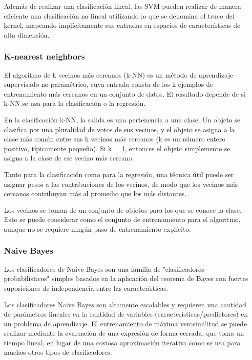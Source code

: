 Además de realizar una clasificación lineal, las SVM pueden realizar de manera eficiente una clasificación no lineal utilizando lo que se denomina el truco del kernel, mapeando implícitamente sus entradas en espacios de características de alta dimensión.\par


\subsubsection{ K-nearest neighbors} \par
El algoritmo de k vecinos más cercanos (k-NN) es un método de aprendizaje supervisado no paramétrico, cuya entrada consta de los k ejemplos de entrenamiento más cercanos en un conjunto de datos. El resultado depende de si k-NN se usa para la clasificación o la regresión.\par
En la clasificación k-NN, la salida es una pertenencia a una clase. Un objeto se clasifica por una pluralidad de votos de sus vecinos, y el objeto se asigna a la clase más común entre sus k vecinos más cercanos (k es un número entero positivo, típicamente pequeño). Si k = 1, entonces el objeto simplemente se asigna a la clase de ese vecino más cercano.\par

Tanto para la clasificación como para la regresión, una técnica útil puede ser asignar pesos a las contribuciones de los vecinos, de modo que los vecinos más cercanos contribuyan más al promedio que los más distantes.\par

Los vecinos se toman de un conjunto de objetos para los que se conoce la clase. Esto se puede considerar como el conjunto de entrenamiento para el algoritmo, aunque no se requiere ningún paso de entrenamiento explícito.\par

\subsubsection{ Naive Bayes} \par
Los clasificadores de Naive Bayes son una familia de "clasificadores probabilísticos" simples basados en la aplicación del teorema de Bayes con fuertes suposiciones de independencia entre las características.\par

Los clasificadores Naive Bayes son altamente escalables y requieren una cantidad de parámetros lineales en la cantidad de variables (características/predictores) en un problema de aprendizaje. El entrenamiento de máxima verosimilitud se puede realizar mediante la evaluación de una expresión de forma cerrada, que toma un tiempo lineal, en lugar de una costosa aproximación iterativa como se usa para muchos otros tipos de clasificadores.\par

